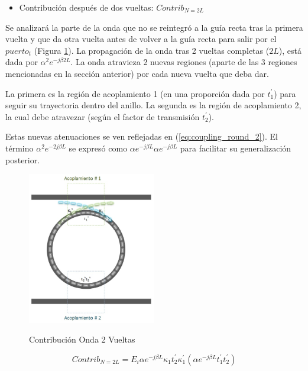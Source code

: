 \begin{itemize}
\item Contribución después de dos vueltas: $Contrib_{N=2L}$
\end{itemize} 

Se analizará la parte de la onda que no se reintegró a la guía recta tras la primera vuelta
y que da otra vuelta antes de volver a la guía recta para salir por el $puerto_t$
(Figura \ref{fig:rr_n2}).
La propagación de la onda tras 2 vueltas completas ($2L$), está dada por 
$\alpha^2 e^{-j \beta 2L}$.
La onda atravieza 2 nuevas regiones (aparte de las 3 regiones mencionadas en la sección anterior)
por cada nueva vuelta que deba dar. 

La primera es la región de acoplamiento 1 (en una proporción dada por $t_1^{'}$) 
para seguir su trayectoria dentro del anillo.
La segunda es la región de acoplamiento 2, la cual debe atravezar (según el factor de transmisión $t_2^{'}$).

Estas nuevas atenuaciones se ven reflejadas en (\ref{eq:coupling_round_2}). 
El término $\alpha^2 e^{-2j \beta L}$ se expresó como
 $\alpha e^{-j \beta L} \alpha e^{-j \beta L}$ para facilitar
su generalización posterior.

\begin{figure}[h!]
\caption{Contribución Onda 2 Vueltas}
\centering
\includegraphics[width=0.5\textwidth,natwidth=562,natheight=667]{figs/rr_n2.jpg}
\label{fig:rr_n2}
\end{figure} 

\begin{equation}
Contrib_{N=2L} = E_i \alpha e^{-j \beta L} \kappa_1 t_2^{'} \kappa_1^{'} (\alpha e^{-j \beta L} t_1^{'} t_2^{'})
\label{eq:coupling_round_2}
\end{equation} 

